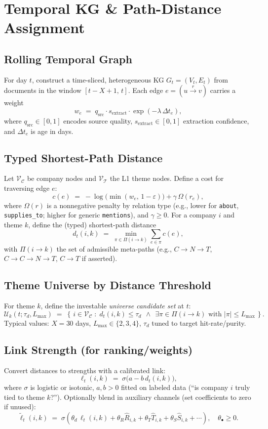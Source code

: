 \documentclass[11pt]{article}
\begin{document}
\section{Temporal KG \& Path-Distance Assignment}

\subsection{Rolling Temporal Graph}
For day $t$, construct a time-sliced, heterogeneous KG $G_t=(V_t,E_t)$ from documents in the window $[t-X+1,\,t]$. Each edge $e=(u\xrightarrow{r}v)$ carries a weight
\[
w_{e} \;=\; q_{\text{src}} \cdot s_{\text{extract}} \cdot \exp(-\lambda\,\Delta t_e),
\]
where $q_{\text{src}}\in[0,1]$ encodes source quality, $s_{\text{extract}}\in[0,1]$ extraction confidence, and $\Delta t_e$ is age in days.

\subsection{Typed Shortest-Path Distance}
Let $\mathcal{V}_\mathcal{C}$ be company nodes and $\mathcal{V}_\mathcal{T}$ the L1 theme nodes. Define a cost for traversing edge $e$:
\[
c(e) \;=\; -\log\!\big(\min(w_{e},\,1-\varepsilon)\big) + \gamma \,\Omega(r_e),
\]
where $\Omega(r)$ is a nonnegative penalty by relation type (e.g., lower for \texttt{about}, \texttt{supplies\_to}; higher for generic \texttt{mentions}), and $\gamma\ge 0$. For a company $i$ and theme $k$, define the (typed) shortest-path distance
\[
d_t(i,k) \;=\; \min_{\pi\in \Pi(i\to k)} \sum_{e\in \pi} c(e),
\]
with $\Pi(i\to k)$ the set of admissible meta-paths (e.g., $C\!\to\!N\!\to\!T$, $C\!\to\!C\!\to\!N\!\to\!T$, $C\!\to\!T$ if asserted).

\subsection{Theme Universe by Distance Threshold}
For theme $k$, define the investable \emph{universe candidate set} at $t$:
\[
\mathcal{U}_k(t;\tau_d, L_{\max}) \;=\; \left\{\, i\in\mathcal{V}_\mathcal{C}\;:\; d_t(i,k)\le \tau_d \ \ \land\ \ \exists \pi\in\Pi(i\to k)\text{ with }|\pi|\le L_{\max}\, \right\}.
\]
Typical values: $X=30$ days, $L_{\max}\in\{2,3,4\}$, $\tau_d$ tuned to target hit-rate/purity.

\subsection{Link Strength (for ranking/weights)}
Convert distances to strengths with a calibrated link:
\[
\ell_t(i,k) \;=\; \sigma\!\big(a - b\, d_t(i,k)\big),
\]
where $\sigma$ is logistic or isotonic, $a,b>0$ fitted on labeled data (``is company $i$ truly tied to theme $k$?''). Optionally blend in auxiliary channels (set coefficients to zero if unused):
\[
\tilde{\ell}_t(i,k) \;=\; \sigma\!\left(\theta_d\,\ell_t(i,k) + \theta_R \hat{R}_{i,k} + \theta_T \hat{T}_{i,k} + \theta_S \hat{S}_{i,k} + \cdots \right),\quad \theta_\bullet \ge 0.
\]
\end{document}
